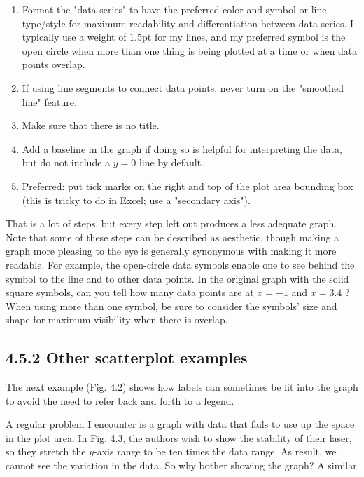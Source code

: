 \begin{enumerate}
  \item Format the "data series" to have the preferred color and symbol or line type/style for maximum readability and differentiation between data series. I typically use a weight of $1.5 \mathrm{pt}$ for my lines, and my preferred symbol is the open circle when more than one thing is being plotted at a time or when data points overlap.

  \item If using line segments to connect data points, never turn on the "smoothed line" feature.

  \item Make sure that there is no title.

  \item Add a baseline in the graph if doing so is helpful for interpreting the data, but do not include a $y=0$ line by default.

  \item Preferred: put tick marks on the right and top of the plot area bounding box (this is tricky to do in Excel; use a "secondary axis").

\end{enumerate}

That is a lot of steps, but every step left out produces a less adequate graph. Note that some of these steps can be described as aesthetic, though making a graph more pleasing to the eye is generally synonymous with making it more readable. For example, the open-circle data symbols enable one to see behind the symbol to the line and to other data points. In the original graph with the solid square symbols, can you tell how many data points are at $x=-1$ and $x=3.4$ ? When using more than one symbol, be sure to consider the symbols' size and shape for maximum visibility when there is overlap.

\subsection*{4.5.2 Other scatterplot examples}
The next example (Fig. 4.2) shows how labels can sometimes be fit into the graph to avoid the need to refer back and forth to a legend.

A regular problem I encounter is a graph with data that fails to use up the space in the plot area. In Fig. 4.3, the authors wish to show the stability of their laser, so they stretch the $y$-axis range to be ten times the data range. As result, we cannot see the variation in the data. So why bother showing the graph? A similar

